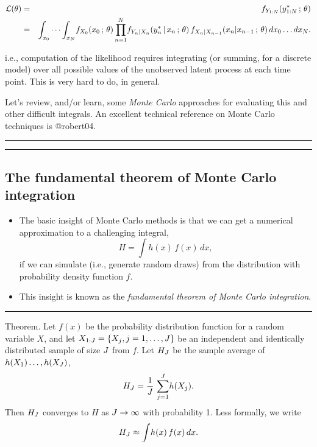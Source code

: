 \documentclass[]{article}
\begin{document}
\begin{eqnarray}
\mathcal{L}(\theta)
&=&
f_{Y_{1:N}}(y_{1:N}^*\, ; \,\theta)
\\
&=&\int_{x_0}\cdots\int_{x_N}\! f_{X_0}(x_0\, ; \,\theta)\prod_{n=1}^{N}\!f_{Y_n|X_n}(y_n^*{\, | \,} x_n\, ; \, \theta)\, f_{X_n|X_{n-1}}(x_n|x_{n-1}\, ; \,\theta)\, dx_0\dots dx_N.
\end{eqnarray}

i.e., computation of the likelihood requires integrating (or summing,
for a discrete model) over all possible values of the unobserved latent
process at each time point. This is very hard to do, in general.

Let's review, and/or learn, some \emph{Monte Carlo} approaches for
evaluating this and other difficult integrals. An excellent technical
reference on Monte Carlo techniques is @robert04.

\begin{center}\rule{0.5\linewidth}{\linethickness}\end{center}

\begin{center}\rule{0.5\linewidth}{\linethickness}\end{center}

\subsection{The fundamental theorem of Monte Carlo
integration}\label{the-fundamental-theorem-of-monte-carlo-integration}

\begin{itemize}
\item
  The basic insight of Monte Carlo methods is that we can get a
  numerical approximation to a challenging integral,
  \[ H = \int h(x)\, f(x)\, dx,\] if we can simulate (i.e., generate
  random draws) from the distribution with probability density function
  \(f\).
\item
  This insight is known as the \emph{fundamental theorem of Monte Carlo
  integration}.
\end{itemize}

\begin{center}\rule{0.5\linewidth}{\linethickness}\end{center}

Theorem. Let \(f(x)\) be the probability distribution function for a
random variable \(X\), and let \(X_{1:J}=\{X_j, j=1,\dots,J\}\)
be an independent and identically distributed sample of size \(J\)
from \(f\). Let \({H_J}\) be the sample average of
\(h(X_1)\dots,h(X_J)\),
\[{H_J} = \frac{1}{J}\,\sum_{j=1}^{J}\!h(X_j).\] Then
\({H_J}\) converges to \(H\) as \(J\to\infty\) with probability 1.
Less formally, we write \[{H_J} \approx \int\!h(x)\,f(x)\,dx.\]
\end{document}
